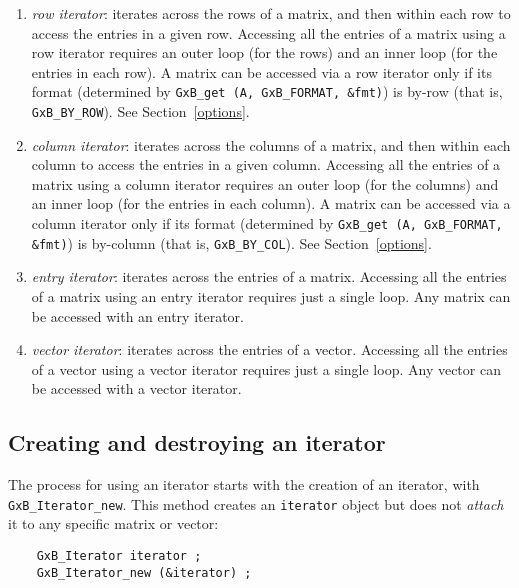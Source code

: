 \documentclass[12pt]{article}
\begin{document}
{    \begin{enumerate}
    \item {\em row iterator}:  iterates across the rows of a matrix, and then
        within each row to access the entries in a given row.  Accessing all
        the entries of a matrix using a row iterator requires an outer loop
        (for the rows) and an inner loop (for the entries in each row).
        A matrix can be accessed via a row iterator only if its format
        (determined by \verb'GxB_get (A, GxB_FORMAT, &fmt)') is by-row
        (that is, \verb'GxB_BY_ROW').
        See Section~\ref{options}.
    \item {\em column iterator}:  iterates across the columns of a matrix, and
        then within each column to access the entries in a given column.
        Accessing all the entries of a matrix using a column iterator requires
        an outer loop (for the columns) and an inner loop (for the entries in
        each column).  A matrix can be accessed via a column iterator only if
        its format (determined by \verb'GxB_get (A, GxB_FORMAT, &fmt)') is
        by-column (that is, \verb'GxB_BY_COL').
        See Section~\ref{options}.
    \item {\em entry iterator}:  iterates across the entries of a matrix.
        Accessing all the entries of a matrix using an entry iterator requires
        just a single loop.  Any matrix can be accessed with an entry iterator.
    \item {\em vector iterator}:  iterates across the entries of a vector.
        Accessing all the entries of a vector using a vector iterator requires
        just a single loop.  Any vector can be accessed with a vector iterator.
    \end{enumerate}

\newpage
\subsection{Creating and destroying an iterator}

The process for using an iterator starts with the creation of an iterator, with
\verb'GxB_Iterator_new'.  This method creates an \verb'iterator' object but
does not {\em attach} it to any specific matrix or vector:

    {\footnotesize
    \begin{verbatim}
    GxB_Iterator iterator ;
    GxB_Iterator_new (&iterator) ; \end{verbatim}}

}
\end{document}
